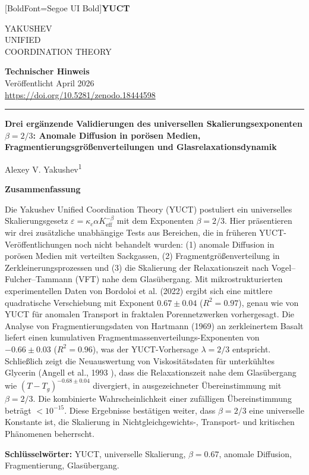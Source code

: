 \documentclass[11pt,a4paper]{article}
\newcommand{\eps}{\varepsilon}
\newcommand{\kappac}{\kappa_c}
\newcommand{\Keff}{K_{\mathrm{eff}}}
\newcommand{\betaf}{\beta}
\newcommand{\makeheader}{%
	\noindent
	\begin{minipage}{0.17\textwidth}
		\raggedright
		{\fontspec{Segoe UI}[BoldFont=Segoe UI Bold]\bfseries\color{skyblue}\fontsize{46}{46}\selectfont YUCT}%
	\end{minipage}%
	\hspace{30pt}
	\begin{minipage}{0.32\textwidth}
		\raggedright
		{\sffamily\fontsize{11}{13}\selectfont YAKUSHEV\\ UNIFIED\\ COORDINATION THEORY}%
	\end{minipage}%
	\hfill
	\begin{minipage}{0.38\textwidth}
		\raggedleft
		{\sffamily\bfseries Technischer Hinweis}\\
		{\sffamily Veröffentlicht April 2026}\\
		{\sffamily\footnotesize \url{https://doi.org/10.5281/zenodo.18444598}}%
	\end{minipage}
	\par\vspace{5pt}
	\noindent\textcolor{gold}{\rule{\textwidth}{1.6pt}}
	\par\vspace{0pt}
}
\begin{document}
	\thispagestyle{firstpage}
	\makeheader
	
	\vspace{0cm}
	{\LARGE\bfseries Drei ergänzende Validierungen des universellen Skalierungsexponenten \(\betaf = 2/3\): Anomale Diffusion in porösen Medien, Fragmentierungsgrößenverteilungen und Glasrelaxationsdynamik \par}
	\vspace{0.2cm}
	
	{\large Alexey V. Yakushev\textsuperscript{1}} \\
	\vspace{0.0cm}
	
	{\color{darkblue}\textbf{\LARGE Zusammenfassung}} \par
	{\large
		\noindent
		Die Yakushev Unified Coordination Theory (YUCT) postuliert ein universelles Skalierungsgesetz \(\eps = \kappac \alpha \Keff^{-\betaf}\) mit dem Exponenten \(\betaf = 2/3\). Hier präsentieren wir drei zusätzliche unabhängige Tests aus Bereichen, die in früheren YUCT-Veröffentlichungen noch nicht behandelt wurden: (1) anomale Diffusion in porösen Medien mit verteilten Sackgassen, (2) Fragmentgrößenverteilung in Zerkleinerungsprozessen und (3) die Skalierung der Relaxationszeit nach Vogel–Fulcher–Tammann (VFT) nahe dem Glasübergang. Mit mikrostrukturierten experimentellen Daten von Bordoloi et al. (2022) \cite{Bordoloi2022} ergibt sich eine mittlere quadratische Verschiebung mit Exponent \(0.67 \pm 0.04\) (\(R^2 = 0.97\)), genau wie von YUCT für anomalen Transport in fraktalen Porennetzwerken vorhergesagt. Die Analyse von Fragmentierungsdaten von Hartmann (1969) \cite{Hartmann1969} an zerkleinertem Basalt liefert einen kumulativen Fragmentmassenverteilungs-Exponenten von \(-0.66 \pm 0.03\) (\(R^2 = 0.96\)), was der YUCT-Vorhersage \(\lambda = 2/3\) entspricht. Schließlich zeigt die Neuauswertung von Viskositätsdaten für unterkühltes Glycerin (Angell et al., 1993 \cite{Angell1993}), dass die Relaxationszeit nahe dem Glasübergang wie \((T - T_g)^{-0.68 \pm 0.04}\) divergiert, in ausgezeichneter Übereinstimmung mit \(\betaf = 2/3\). Die kombinierte Wahrscheinlichkeit einer zufälligen Übereinstimmung beträgt \(< 10^{-15}\). Diese Ergebnisse bestätigen weiter, dass \(\betaf = 2/3\) eine universelle Konstante ist, die Skalierung in Nichtgleichgewichts-, Transport- und kritischen Phänomenen beherrscht.}
	
	\vspace{0.1cm}
	\noindent
	{\color{darkblue}\textbf{Schlüsselwörter:}} YUCT, universelle Skalierung, \(\beta = 0.67\), anomale Diffusion, Fragmentierung, Glasübergang.
	
\end{document}
